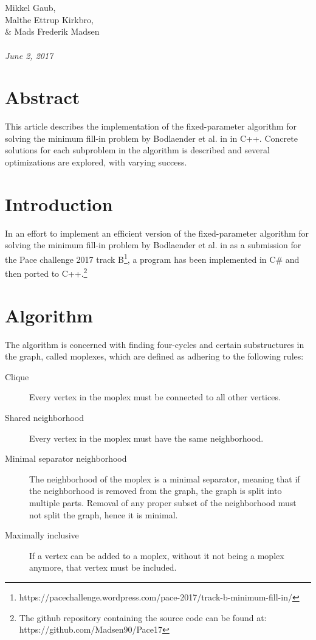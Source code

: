 \documentclass{article}
\begin{document}
\begin{titlepage}
		 \\ \\
		Mikkel Gaub, \\ Malthe Ettrup Kirkbro, \\ \& Mads Frederik Madsen	\\ \\
		\hspace{-18pt}
		\textit{June 2, 2017}
		\thispagestyle{empty}
		\vspace{\fill}
		\section*{Abstract}
		This article describes the implementation of the fixed-parameter algorithm for solving the minimum fill-in problem by Bodlaender et al. in \cite{algorithm} in C++. Concrete solutions for each subproblem in the algorithm is described and several optimizations are explored, with varying success.
	\end{titlepage}
	\clearpage

	\section{Introduction}
	In an effort to implement an efficient version of the fixed-parameter algorithm for solving the minimum fill-in problem by Bodlaender et al. in \cite{algorithm} as a submission for the Pace challenge 2017 track B\footnote{https://pacechallenge.wordpress.com/pace-2017/track-b-minimum-fill-in/}, a program has been implemented in C\# and then ported to C++.\footnote{The github repository containing the source code can be found at: https://github.com/Madsen90/Pace17}

	\section{Algorithm}
	The algorithm is concerned with finding four-cycles and certain substructures in the graph, called moplexes, which are defined as adhering to the following rules: \\

	\begin{description}
		\item[Clique] Every vertex in the moplex must be connected to all other vertices.
		\item[Shared neighborhood] Every vertex in the moplex must have the same neighborhood.
		\item[Minimal separator neighborhood] The neighborhood of the moplex is a minimal separator, meaning that if the neighborhood is removed from the graph, the graph is split into multiple parts. Removal of any proper subset of the neighborhood must not split the graph, hence it is minimal.
		\item[Maximally inclusive] If a vertex can be added to a moplex, without it not being a moplex anymore, that vertex must be included.
	\end{description}
\end{document}
